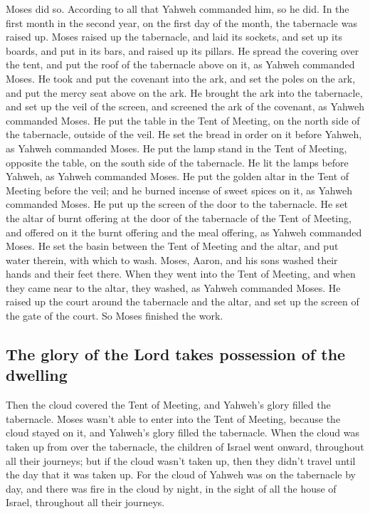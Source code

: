  Moses did so. According to all that Yahweh commanded
him, so he did.  In the first month in the second year,
on the first day of the month, the tabernacle was raised up.
 Moses raised up the tabernacle, and laid its sockets,
and set up its boards, and put in its bars, and raised up its pillars.
 He spread the covering over the tent, and put the roof
of the tabernacle above on it, as Yahweh commanded Moses.
 He took and put the covenant into the ark, and set the
poles on the ark, and put the mercy seat above on the ark.
 He brought the ark into the tabernacle, and set up the
veil of the screen, and screened the ark of the covenant, as Yahweh
commanded Moses.  He put the table in the Tent of
Meeting, on the north side of the tabernacle, outside of the veil.
 He set the bread in order on it before Yahweh, as Yahweh
commanded Moses.  He put the lamp stand in the Tent of
Meeting, opposite the table, on the south side of the tabernacle.
 He lit the lamps before Yahweh, as Yahweh commanded
Moses.  He put the golden altar in the Tent of Meeting
before the veil;  and he burned incense of sweet spices
on it, as Yahweh commanded Moses.  He put up the screen
of the door to the tabernacle.  He set the altar of burnt
offering at the door of the tabernacle of the Tent of Meeting, and
offered on it the burnt offering and the meal offering, as Yahweh
commanded Moses.  He set the basin between the Tent of
Meeting and the altar, and put water therein, with which to wash.
 Moses, Aaron, and his sons washed their hands and their
feet there.  When they went into the Tent of Meeting, and
when they came near to the altar, they washed, as Yahweh commanded
Moses.  He raised up the court around the tabernacle and
the altar, and set up the screen of the gate of the court. So Moses
finished the work.

\hypertarget{the-glory-of-the-lord-takes-possession-of-the-dwelling}{%
\subsection{The glory of the Lord takes possession of the
dwelling}\label{the-glory-of-the-lord-takes-possession-of-the-dwelling}}

 Then the cloud covered the Tent of Meeting, and Yahweh's
glory filled the tabernacle.  Moses wasn't able to enter
into the Tent of Meeting, because the cloud stayed on it, and Yahweh's
glory filled the tabernacle.  When the cloud was taken up
from over the tabernacle, the children of Israel went onward, throughout
all their journeys;  but if the cloud wasn't taken up,
then they didn't travel until the day that it was taken up.
 For the cloud of Yahweh was on the tabernacle by day,
and there was fire in the cloud by night, in the sight of all the house
of Israel, throughout all their journeys.
